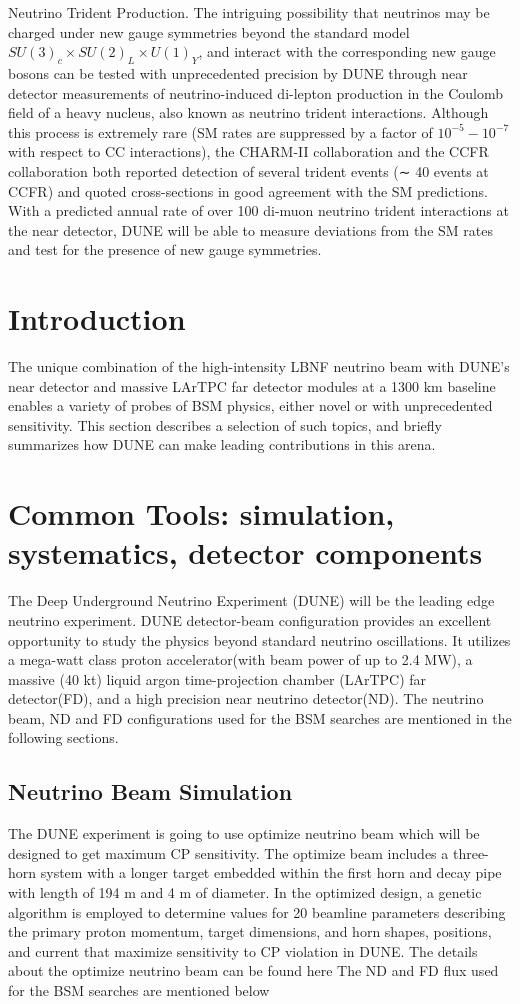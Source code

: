 Neutrino Trident Production. The intriguing possibility that neutrinos may be charged under new gauge symmetries beyond the standard model $SU(3)_{c} \times SU(2)_{L} \times U(1)_{Y}$, and interact with the corresponding new gauge bosons can be tested with unprecedented precision by DUNE through near detector measurements of neutrino-induced di-lepton production in the Coulomb field of a heavy nucleus, also known as neutrino trident interactions. Although this process is extremely rare (SM rates are suppressed by a factor of $10^{−5} − 10^{−7}$ with respect to CC interactions), the CHARM-II collaboration and the CCFR collaboration both reported detection of several trident events (∼ 40 events at CCFR) and quoted cross-sections in good agreement with the SM predictions. With a predicted annual rate of over 100 di-muon neutrino trident interactions at the near detector, DUNE will be able to measure deviations from the SM rates and test for the presence of new gauge symmetries.

\section{Introduction}
The unique combination of the high-intensity LBNF neutrino beam with DUNE's near detector and massive LArTPC far detector modules at a 1300 km baseline enables a variety of probes of BSM physics, either novel or with unprecedented sensitivity. This section describes a selection of such topics, and briefly summarizes how DUNE can make leading contributions in this arena.

\section{Common Tools: simulation, systematics, detector components}
The Deep Underground Neutrino Experiment (DUNE) will be the leading edge neutrino experiment. DUNE detector-beam configuration  provides an excellent opportunity to study the physics beyond standard neutrino
oscillations. It utilizes a mega-watt class proton accelerator(with beam power of up to 2.4 MW), a massive (40 kt) liquid argon time-projection chamber (LArTPC) far detector(FD), and a high precision near neutrino detector(ND). The neutrino beam, ND and FD configurations used for the BSM searches are mentioned in the following sections.
\subsection{Neutrino Beam Simulation}
The DUNE experiment is going to use optimize neutrino beam which will be designed to get maximum CP sensitivity. The optimize beam includes  a three-horn system with a longer target embedded within the first horn and decay pipe with length of 194 m and 4 m of diameter. In the optimized design, a genetic algorithm is employed to determine values for 20 beamline parameters describing the primary proton momentum, target dimensions, and horn shapes, positions, and current that maximize sensitivity to CP violation in DUNE. The details about the optimize neutrino beam can be found here\cite{Laura:2017} The ND and FD flux used for the BSM searches are mentioned below 

